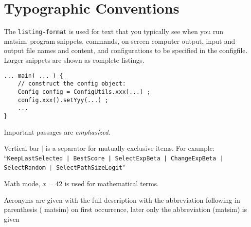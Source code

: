 \section*{Typographic Conventions}
\label{sec:typogr-conv}
The \lstinline|listing-format| is used for text that you typically see when you run \gls{matsim}, \ie program snippets, commands, on-screen computer output, input and output file names and content, and configurations to be specified in the \gls{configfile}. Larger snippets are shown as complete listings.
\begin{lstlisting}
... main( ... ) {
    // construct the config object:
    Config config = ConfigUtils.xxx(...) ;
    config.xxx().setYyy(...) ;
    ...
}
\end{lstlisting}

Important passages are \emph{emphasized}. 


Vertical bar $\lvert$ is a separator for mutually exclusive items. For example: ``\lstinline$KeepLastSelected | BestScore | SelectExpBeta | ChangeExpBeta | SelectRandom | SelectPathSizeLogit$''

Math mode, \eg $x=42$ is used for mathematical terms.

\glsresetall
Acronyms are given with the full description with the abbreviation following in parenthesis (\eg 
\gls{matsim}) on first occurrence, later only the abbreviation (\eg \gls{matsim}) is given



